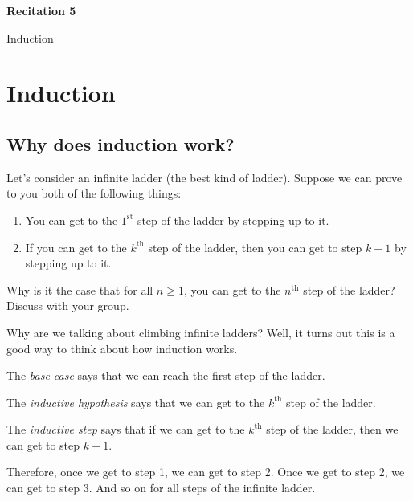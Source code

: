 \documentclass[12pt,letterpaper]{article}
\newif\ifsol
\newcommand{\solu}[2]{ \begin{mdframed} \ifsol #2 \else \vspace{#1} \fi \end{mdframed} }
\begin{document}
  \thispagestyle{firstpagestyle}
  \begin{center}
    {\large \textbf{Recitation 5}}
    
    {\large Induction}
  \end{center}
 
 
\section*{Induction}
 
 \subsection*{Why does induction work?}
 
 Let's consider an infinite ladder (the best kind of ladder). Suppose we can prove to you both of the following things:
 
 \begin{enumerate}
 \item You can get to the $1^{\text{st}}$ step of the ladder by stepping up to it.
 \item If you can get to the $k^{\text{th}}$ step of the ladder, then you can get to step $k+1$ by stepping up to it.
 \end{enumerate}
 
Why is it the case that for all $n \geq 1$, you can get to the $n^{\text{th}}$ step of the ladder? Discuss with your group.

\solu{2cm}{We already know we can get to the first step from the first statement. Then, we know we can get to the second step from the second statement. From there, the process repeats and we conclude that we can get to the third, then the fourth... and so on.}
 
 Why are we talking about climbing infinite ladders? Well, it turns out this is a good way to think about how induction works. 

	The \textit{base case} says that we can reach the first step of the ladder.

	The \textit{inductive hypothesis} says that we can get to the $k^{\text{th}}$ step of the ladder.

	The \textit{inductive step} says that if we can get to the $k^{\text{th}}$ step of the ladder, then we can get to step $k+1$. 

	Therefore, once we get to step 1, we can get to step 2. Once we get to step 2, we can get to step 3. And so on for all steps of the infinite ladder.
 
\end{document}
